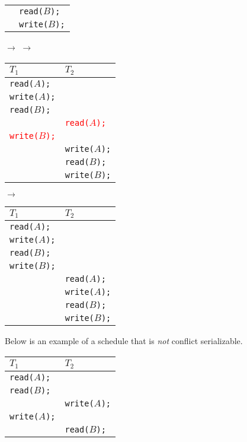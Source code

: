 \documentclass{report}
\newenvironment{example}{\begin{tcolorbox}[title={Example},colback=green!5!white,colframe=black!75!green]}{\end{tcolorbox}}
\renewcommand{\tt}[1]{\texttt{{#1}}}
\renewcommand{\it}[1]{\textit{{#1}}}
\begin{document}
\begin{example}
{\begin{tabular}{l|l}
                                              & \tt{read($B$);} \\
                             & \tt{write($B$);} \\
        \end{tabular}
        $\to$
        \newline
        $\to$
        \begin{tabular}{l|l}
            $T_1$ & $T_2$ \\
            \hline
            \tt{read($A$);} & \\
            \tt{write($A$);} & \\
            \tt{read($B$);} & \\
                            & \tt{\textcolor{red}{read($A$);}} \\
            \tt{\textcolor{red}{write($B$);}} & \\
                             & \tt{write($A$);} \\
                             & \tt{read($B$);} \\
                             & \tt{write($B$);} \\
        \end{tabular}
        $\to$
        \begin{tabular}{l|l}
            $T_1$ & $T_2$ \\
            \hline
            \tt{read($A$);} & \\
            \tt{write($A$);} & \\
            \tt{read($B$);} & \\
            \tt{write($B$);} & \\
                         & \tt{read($A$);} \\
                         & \tt{write($A$);} \\
                         & \tt{read($B$);} \\
                         & \tt{write($B$);} \\
        \end{tabular}
        \par
    }
\end{example}

\begin{example}
    Below is an example of a schedule that is \it{not} conflict serializable.

    {
        \centering
        \begin{tabular}{l|l}
            $T_1$ & $T_2$ \\
            \hline
            \tt{read($A$);} & \\
            \tt{read($B$);} & \\
                             & \tt{write($A$);} \\
            \tt{write($A$);} & \\
                             & \tt{read($B$);} \\
        \end{tabular}
        \par
    }
\end{example}
\end{document}
